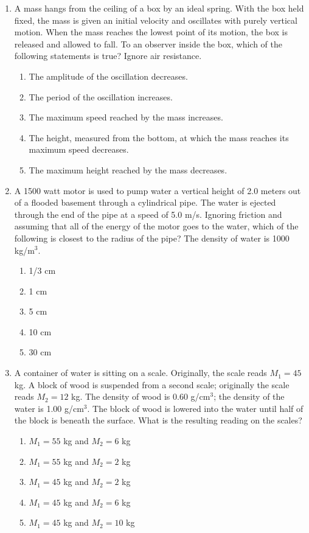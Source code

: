 \documentclass[12pt,letterpaper]{article}
\begin{document}
\begin{enumerate}[resume]
\item
A mass hangs from the ceiling of a box by an ideal spring. With the box held fixed, the mass is given an initial velocity and oscillates with purely vertical motion. When the mass reaches the lowest point of its motion, the box is released and allowed to fall. To an observer inside the box, which of the following statements is true? Ignore air resistance.
\begin{enumerate}
\item The amplitude of the oscillation decreases.
\item The period of the oscillation increases.
\item The maximum speed reached by the mass increases.
\item The height, measured from the bottom, at which the mass reaches its maximum speed decreases.
\item The maximum height reached by the mass decreases.
\end{enumerate}

\item
A 1500 watt motor is used to pump water a vertical height of 2.0 meters out of a flooded basement through a cylindrical pipe. The water is ejected through the end of the pipe at a speed of 5.0 m/s. Ignoring friction and assuming that all of the energy of the motor goes to the water, which of the following is closest to the radius of the pipe? The density of water is 1000 kg/m$^3$.
\begin{enumerate}
\item 1/3 cm
\item 1 cm
\item 5 cm
\item 10 cm
\item 30 cm
\end{enumerate}

\item
A container of water is sitting on a scale. Originally, the scale reads $M_1 = 45$ kg. A block of wood is suspended from a second scale; originally the scale reads $M_2 = 12$ kg. The density of wood is 0.60 g/cm$^3$; the density of the water is 1.00 g/cm$^3$. The block of wood is lowered into the water until half of the block is beneath the surface. What is the resulting reading on the scales?
\begin{enumerate}
\item $M_1 = 55$ kg and $M_2 = 6$ kg
\item $M_1 = 55$ kg and $M_2 = 2$ kg
\item $M_1 = 45$ kg and $M_2 = 2$ kg
\item $M_1 = 45$ kg and $M_2 = 6$ kg
\item $M_1 = 45$ kg and $M_2 = 10$ kg
\end{enumerate}


\end{enumerate}
\end{document}
